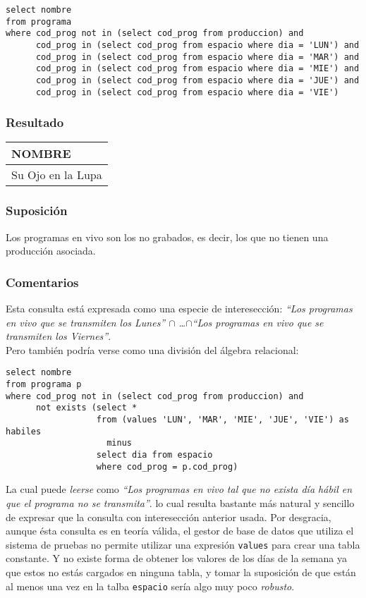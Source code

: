 \begin{lstlisting} 
select nombre 
from programa
where cod_prog not in (select cod_prog from produccion) and
      cod_prog in (select cod_prog from espacio where dia = 'LUN') and
      cod_prog in (select cod_prog from espacio where dia = 'MAR') and
      cod_prog in (select cod_prog from espacio where dia = 'MIE') and
      cod_prog in (select cod_prog from espacio where dia = 'JUE') and
      cod_prog in (select cod_prog from espacio where dia = 'VIE')
\end{lstlisting}

\subsubsection*{Resultado}
\begin{tabular}{|l|}
  \hline
    \bf{NOMBRE} \\ 
  \hline
    Su Ojo en la Lupa \\ 
  \hline
\end{tabular} 

\subsubsection*{Suposición}
Los programas en vivo son los no grabados, es decir, los que no tienen una producción asociada. \\

\subsubsection*{Comentarios}
Esta consulta está expresada como una especie de interesección: \textit{``Los programas en vivo que se transmiten los Lunes'' $\cap$ \ldots $\cap$``Los programas en vivo que se transmiten los Viernes''}. \\

Pero también podría verse como una división del álgebra relacional:
\begin{lstlisting} 
select nombre 
from programa p
where cod_prog not in (select cod_prog from produccion) and
      not exists (select * 
                  from (values 'LUN', 'MAR', 'MIE', 'JUE', 'VIE') as habiles
                    minus
                  select dia from espacio 
                  where cod_prog = p.cod_prog)
\end{lstlisting}
 
La cual puede \textit{leerse} como \textit{``Los programas en vivo tal que no exista día hábil en que el programa no se transmita''}. lo cual resulta bastante más natural y sencillo de expresar que la consulta con interesección anterior usada. Por desgracia, aunque ésta consulta es en teoría válida\cite{values_expression}, el gestor de base de datos que utiliza el sistema de pruebas no permite utilizar una expresión \lstinline|values| para crear una tabla constante. Y no existe forma de obtener los valores de los días de la semana ya que estos no estás cargados en ninguna tabla, y tomar la suposición de que están al menos una vez en la talba \texttt{espacio} sería algo muy poco \textit{robusto}. \\

